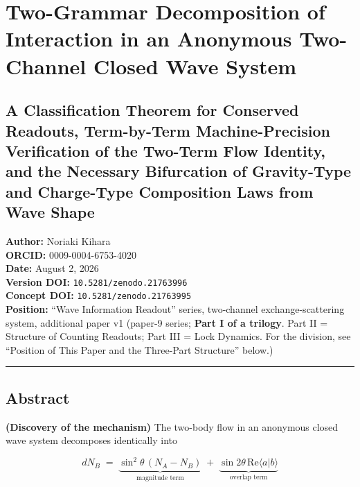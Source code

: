 \documentclass[
  a4paper,
]{article}
\author{}
\date{}
\begin{document}
\section{Two-Grammar Decomposition of Interaction in an Anonymous
Two-Channel Closed Wave
System}\label{two-grammar-decomposition-of-interaction-in-an-anonymous-two-channel-closed-wave-system}

\subsection{A Classification Theorem for Conserved Readouts,
Term-by-Term Machine-Precision Verification of the Two-Term Flow
Identity, and the Necessary Bifurcation of Gravity-Type and Charge-Type
Composition Laws from Wave
Shape}\label{a-classification-theorem-for-conserved-readouts-term-by-term-machine-precision-verification-of-the-two-term-flow-identity-and-the-necessary-bifurcation-of-gravity-type-and-charge-type-composition-laws-from-wave-shape}

\textbf{Author:} Noriaki Kihara\\
\textbf{ORCID:} 0009-0004-6753-4020\\
\textbf{Date:} August 2, 2026\\
\textbf{Version DOI:} \texttt{10.5281/zenodo.21763996}\\
\textbf{Concept DOI:} \texttt{10.5281/zenodo.21763995}\\
\textbf{Position:} ``Wave Information Readout'' series, two-channel
exchange-scattering system, additional paper v1 (paper-9 series;
\textbf{Part I of a trilogy}. Part II = Structure of Counting Readouts;
Part III = Lock Dynamics. For the division, see ``Position of This Paper
and the Three-Part Structure'' below.)

\begin{center}\rule{0.5\linewidth}{0.5pt}\end{center}

\subsection{Abstract}\label{abstract}

\textbf{(Discovery of the mechanism)} The two-body flow in an anonymous
closed wave system decomposes identically into

\[
dN_B
\;=\;
\underbrace{\sin^2\theta\,(N_A - N_B)}_{\text{magnitude term}}
\;+\;
\underbrace{\sin 2\theta\,\mathrm{Re}\langle a|b\rangle}_{\text{overlap term}}
\]
\end{document}
